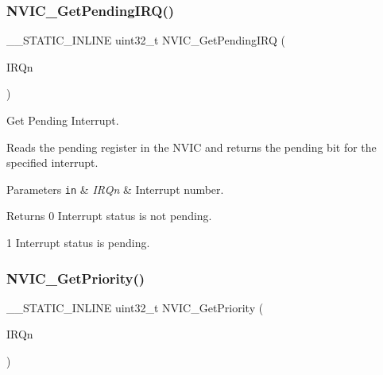 \subsubsection{\texorpdfstring{N\+V\+I\+C\+\_\+\+Get\+Pending\+I\+R\+Q()}{NVIC\_GetPendingIRQ()}}
{\footnotesize\ttfamily \+\_\+\+\_\+\+S\+T\+A\+T\+I\+C\+\_\+\+I\+N\+L\+I\+NE uint32\+\_\+t N\+V\+I\+C\+\_\+\+Get\+Pending\+I\+RQ (\begin{DoxyParamCaption}\item[{\mbox{\hyperlink{group___peripheral__interrupt__number__definition_ga7e1129cd8a196f4284d41db3e82ad5c8}{I\+R\+Qn\+\_\+\+Type}}}]{I\+R\+Qn }\end{DoxyParamCaption})}



Get Pending Interrupt. 

Reads the pending register in the N\+V\+IC and returns the pending bit for the specified interrupt. 
\begin{DoxyParams}[1]{Parameters}
\mbox{\tt in}  & {\em I\+R\+Qn} & Interrupt number. \\
\hline
\end{DoxyParams}
\begin{DoxyReturn}{Returns}
0 Interrupt status is not pending. 

1 Interrupt status is pending. 
\end{DoxyReturn}
\mbox{\label{group___c_m_s_i_s___core___n_v_i_c_functions_ga1cbaf8e6abd4aa4885828e7f24fcfeb4}} 
\subsubsection{\texorpdfstring{N\+V\+I\+C\+\_\+\+Get\+Priority()}{NVIC\_GetPriority()}}
{\footnotesize\ttfamily \+\_\+\+\_\+\+S\+T\+A\+T\+I\+C\+\_\+\+I\+N\+L\+I\+NE uint32\+\_\+t N\+V\+I\+C\+\_\+\+Get\+Priority (\begin{DoxyParamCaption}\item[{\mbox{\hyperlink{group___peripheral__interrupt__number__definition_ga7e1129cd8a196f4284d41db3e82ad5c8}{I\+R\+Qn\+\_\+\+Type}}}]{I\+R\+Qn }\end{DoxyParamCaption})}



